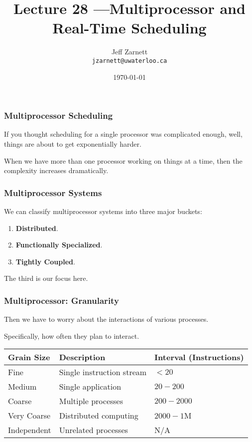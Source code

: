 

\title{Lecture 28 ---Multiprocessor and Real-Time Scheduling}

\author{Jeff Zarnett \\ \small \texttt{jzarnett@uwaterloo.ca}}
\date{\today}




\begin{frame}
  \titlepage

 \end{frame}

\begin{frame}
\frametitle{Multiprocessor Scheduling}

If you thought scheduling for a single processor was complicated enough, well, things are about to get exponentially harder. 

When we have more than one processor working on things at a time, then the complexity increases dramatically. 


\end{frame}

\begin{frame}
\frametitle{Multiprocessor Systems}

We can classify multiprocessor systems into three major buckets:

\begin{enumerate}
	\item \textbf{Distributed}.
	\item \textbf{Functionally Specialized}.
	\item \textbf{Tightly Coupled}.
\end{enumerate}

The third is our focus here.

\end{frame}

\begin{frame}
\frametitle{Multiprocessor: Granularity}

Then we have to worry about the interactions of various processes.

Specifically, how often they plan to interact.

\begin{center}
\begin{tabular}{l|l|l}
	\textbf{Grain Size} & \textbf{Description} & \textbf{Interval (Instructions)}\\ \hline
	Fine & Single instruction stream & $< 20$ \\\hline
	Medium & Single application & $20 - 200$ \\\hline
	Coarse & Multiple processes & $200 - 2000$ \\\hline
	Very Coarse & Distributed computing & $2000 - 1$M \\\hline
	Independent & Unrelated processes & N/A \\

\end{tabular}
\end{center}

\end{frame}

